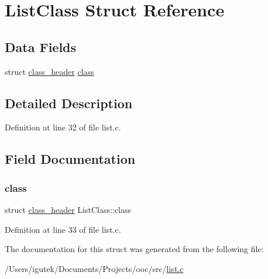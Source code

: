 \hypertarget{structListClass}{}\section{List\+Class Struct Reference}
\label{structListClass}
\subsection*{Data Fields}
\begin{DoxyCompactItemize}
\item 
struct \mbox{\hyperlink{structclass__header}{class\+\_\+header}} \mbox{\hyperlink{structListClass_a8e823d87f5a5919ed02857462c475c91}{class}}
\end{DoxyCompactItemize}


\subsection{Detailed Description}


Definition at line 32 of file list.\+c.



\subsection{Field Documentation}
\mbox{\label{structListClass_a8e823d87f5a5919ed02857462c475c91}} 
\subsubsection{\texorpdfstring{class}{class}}
{\footnotesize\ttfamily struct \mbox{\hyperlink{structclass__header}{class\+\_\+header}} List\+Class\+::class}



Definition at line 33 of file list.\+c.



The documentation for this struct was generated from the following file\+:\begin{DoxyCompactItemize}
\item 
/\+Users/igutek/\+Documents/\+Projects/ooc/src/\mbox{\hyperlink{list_8c}{list.\+c}}\end{DoxyCompactItemize}
